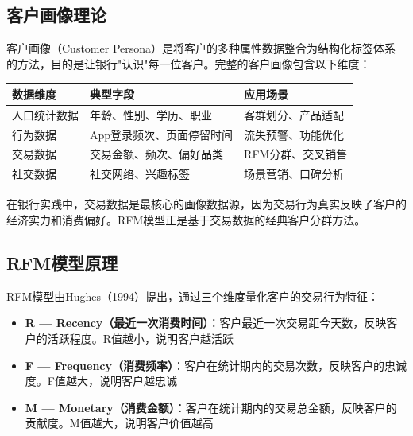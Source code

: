 \subsection{客户画像理论}

客户画像（Customer Persona）是将客户的多种属性数据整合为结构化标签体系的方法，目的是让银行"认识"每一位客户。完整的客户画像包含以下维度：

\begin{table}[H]
\centering
\begin{tabular}{lp{4cm}p{5cm}}
\toprule
\textbf{数据维度} & \textbf{典型字段} & \textbf{应用场景} \\
\midrule
人口统计数据 & 年龄、性别、学历、职业 & 客群划分、产品适配 \\
行为数据 & App登录频次、页面停留时间 & 流失预警、功能优化 \\
交易数据 & 交易金额、频次、偏好品类 & RFM分群、交叉销售 \\
社交数据 & 社交网络、兴趣标签 & 场景营销、口碑分析 \\
\bottomrule
\end{tabular}
\end{table}

在银行实践中，交易数据是最核心的画像数据源，因为交易行为真实反映了客户的经济实力和消费偏好。RFM模型正是基于交易数据的经典客户分群方法。

\subsection{RFM模型原理}

RFM模型由Hughes（1994）提出，通过三个维度量化客户的交易行为特征：

\begin{itemize}[leftmargin=2em]
  \item \textbf{R --- Recency（最近一次消费时间）}：客户最近一次交易距今天数，反映客户的活跃程度。R值越小，说明客户越活跃
  \item \textbf{F --- Frequency（消费频率）}：客户在统计期内的交易次数，反映客户的忠诚度。F值越大，说明客户越忠诚
  \item \textbf{M --- Monetary（消费金额）}：客户在统计期内的交易总金额，反映客户的贡献度。M值越大，说明客户价值越高
\end{itemize}

